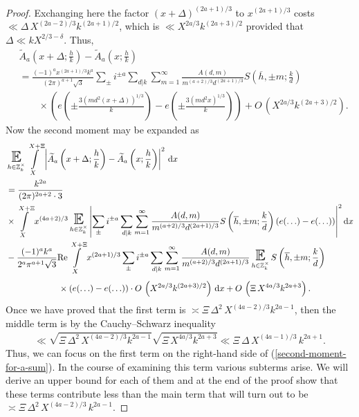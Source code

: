 \documentclass[a4paper,10pt,twoside]{amsart}
\theoremstyle{definition}
\numberwithin{equation}{section}
\newcommand\E{\mathbb{E}}
\renewcommand{\Re}{\textnormal{Re}}
\renewcommand\:{\colon}
\begin{document}
\begin{proof}
Exchanging here the factor $(x+\Delta)^{(2a+1)/3}$ to $x^{(2a+1)/3}$ costs $\ll\Delta\,X^{(2a-2)/3}k^{(2a+1)/2}$, which is $\ll X^{2a/3}k^{(2a+3)/2}$ provided that $\Delta\ll kX^{2/3-\delta}$. Thus,
\begin{align*}
&\widetilde A_a\left(x+\Delta;\frac hk\right)-\widetilde A_a\left(x;\frac hk\right)\\
&=\frac{(-1)^ax^{(2a+1)/3}k^a}{(2\pi)^{a+1}\sqrt3}\sum_\pm i^{\pm a}\sum_{d|k}\sum_{m=1}^\infty\frac{A(d,m)}{m^{(a+2)/3}d^{(2a+1)/3}}S\left(\overline h,\pm m;\frac kd\right)\\&\qquad
\times\left(e\!\left(\pm\frac{3(md^2(x+\Delta))^{1/3}}k\right)-e\!\left(\pm\frac{3(md^2x)^{1/3}}k\right)\right)+O\,\left(X^{2a/3}k^{(2a+3)/2}\right).
\end{align*}
Now the second moment may be expanded as
\begin{align}\label{second-moment-for-a-sum}
&\mathop{\text{\LARGE$\E$}}_{h\in\mathbb Z_k^\times}\int\limits_X^{X+\Xi}\left|\widetilde A_a\left(x+\Delta;\frac hk\right)-\widetilde A_a\left(x;\frac hk\right)\right|^2\,\mathrm dx \nonumber\\
&=\frac{k^{2a}}{(2\pi)^{2a+2}\cdot3} \nonumber\\
&\times\int\limits_X^{X+\Xi}x^{(4a+2)/3}\mathop{\text{\LARGE$\E$}}_{h\in\mathbb Z_k^\times}\left|\sum_\pm i^{\pm a}\sum_{d|k}\sum_{m=1}^\infty\frac{A(d,m)}{m^{(a+2)/3}d^{(2a+1)/3}}S\left(\overline h,\pm m;\frac kd\right)\left(e\!\left(\ldots\right)-e\!\left(\ldots\right)\right)\right|^2\mathrm dx \nonumber\\
&-\frac{(-1)^ak^a}{2^a\pi^{a+1}\sqrt3}\Re\int\limits_X^{X+\Xi}x^{(2a+1)/3}\sum_\pm i^{\pm a}\sum_{d|k}\sum_{m=1}^\infty\frac{A(d,m)}{m^{(a+2)/3}d^{(2a+1)/3}}
\mathop{\text{\LARGE$\E$}}_{h\in\mathbb Z_k^\times}S\left(\overline h,\pm m;\frac kd\right) \nonumber \\
&\qquad\qquad\qquad\times\left(e\!\left(\ldots\right)-e\!\left(\ldots\right)\right)\cdot O\,\left(X^{2a/3}k^{(2a+3)/2}\right)\,\mathrm dx+O\,\left(\Xi\,X^{4a/3}k^{2a+3}\right).
\end{align}
Once we have proved that the first term is $\asymp\Xi\,\Delta^2\,X^{(4a-2)/3}k^{2a-1}$, then the middle term is by the Cauchy--Schwarz inequality
\begin{align}\label{Estimate-1}
\ll\sqrt{\Xi\,\Delta^2\,X^{(4a-2)/3}k^{2a-1}}\sqrt{\Xi\,X^{4a/3}k^{2a+3}}
\ll\Xi\,\Delta\,X^{(4a-1)/3}\,k^{2a+1}.
\end{align}
Thus, we can focus on the first term on the right-hand side of (\ref{second-moment-for-a-sum}). In the course of examining this term various subterms arise. We will derive an upper bound for each of them and at the end of the proof show that these terms contribute less than the main term that will turn out to be $\asymp\Xi\,\Delta^2\,X^{(4a-2)/3}\,k^{2a-1}$. 


\end{proof}
\end{document}
